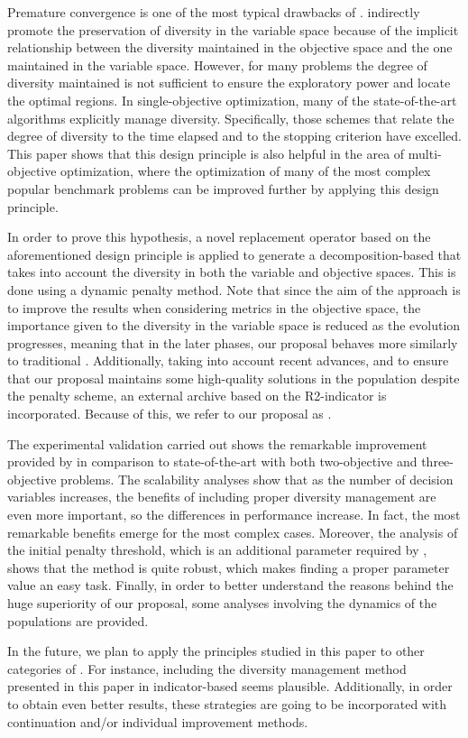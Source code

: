Premature convergence is one of the most typical drawbacks of \EAS{}.
%
\MOEAS{} indirectly promote the preservation of diversity in the variable space
because of the implicit relationship between the diversity maintained in the objective space and the
one maintained in the variable space.
%
However, for many problems the degree of diversity maintained is not sufficient to ensure the exploratory
power and locate the optimal regions.
%
In single-objective optimization, many of the state-of-the-art algorithms explicitly manage
diversity.
%
Specifically, those schemes that relate the degree of diversity to the time elapsed and to the stopping criterion
have excelled.
%
This paper shows that this design principle is also helpful in the area of multi-objective optimization,
where the optimization of many of the most complex popular benchmark problems can be improved further
by applying this design principle.

In order to prove this hypothesis, a novel replacement operator based on the aforementioned design principle
is applied to generate a decomposition-based \MOEA{} that takes into account the diversity in both the variable 
and objective spaces.
%
This is done using a dynamic penalty method. 
%
Note that since the aim of the approach is to improve the results when considering metrics in the objective space,
the importance given to the diversity in the variable space is reduced as the evolution progresses, meaning that
in the later phases, our proposal behaves more similarly to traditional \MOEAS{}.
%
Additionally, taking into account recent advances, and to ensure that our proposal maintains
some high-quality solutions in the population despite the penalty scheme, an external archive based on the
R2-indicator is incorporated.
%
Because of this, we refer to our proposal as \AVSDMOEAD{}.
%

The experimental validation carried out shows the remarkable improvement provided by \AVSDMOEAD{} in comparison to
state-of-the-art \MOEAS{} with both two-objective and three-objective problems.
%
The scalability analyses show that as the number of decision variables increases, the benefits of including
proper diversity management are even more important, so the differences in performance increase.
%
In fact, the most remarkable benefits emerge for the most complex cases.
%
Moreover, the analysis of the initial penalty threshold, which is an additional parameter required by \AVSDMOEAD{}, 
shows that the method is quite robust, which makes finding a proper parameter value an easy task.
%
Finally, in order to better understand the reasons behind the huge superiority of our proposal, some analyses involving
the dynamics of the populations are provided.

In the future, we plan to apply the principles studied in this paper to other categories of \MOEAS{}.
%
For instance, including the diversity management method presented in this paper in indicator-based \MOEAS{} seems plausible.
%
Additionally, in order to obtain even better results, these strategies are going to be incorporated with continuation and/or individual
improvement methods.

